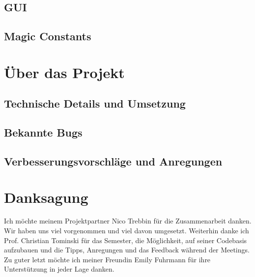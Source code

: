 \documentclass[final,nopreprintline]{elsarticle}
\begin{document}
\subsection{GUI}
\label{subsec:gui}
    

\subsection{Magic Constants}
\label{subsec:consts}
    


\section{Über das Projekt}
\label{sec:about}

\subsection{Technische Details und Umsetzung}
\label{subsec:technical}
    

\subsection{Bekannte Bugs}
\label{subsec:bugs}
    

\subsection{Verbesserungsvorschläge und Anregungen}
\label{subsec:suggest}
    

\section*{Danksagung}
Ich möchte meinem Projektpartner Nico Trebbin für die Zusammenarbeit danken. Wir haben uns viel vorgenommen und viel davon umgesetzt.
Weiterhin danke ich Prof. Christian Tominski für das Semester, die Möglichkeit, auf seiner Codebasis aufzubauen und die Tipps, Anregungen und das Feedback während der Meetings.
Zu guter letzt möchte ich meiner Freundin Emily Fuhrmann für ihre Unterstützung in jeder Lage danken.

 


%
\end{document}
